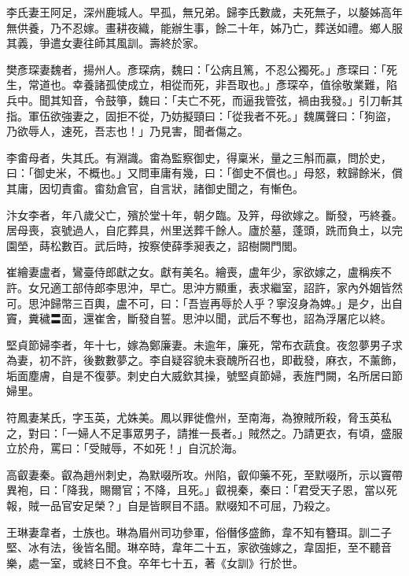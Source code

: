 \begin{pinyinscope}
 李氏妻王阿足，深州鹿城人。早孤，無兄弟。歸李氏數歲，夫死無子，以嫠姊高年無供養，乃不忍嫁。畫耕夜織，能辦生事，餘二十年，姊乃亡，葬送如禮。鄉人服其義，爭遣女妻往師其風訓。壽終於家。



 樊彥琛妻魏者，揚州人。彥琛病，魏曰：「公病且篤，不忍公獨死。」彥琛曰：「死生，常道也。幸養諸孤使成立，相從而死，非吾取也。」彥琛卒，值徐敬業難，陷兵中。聞其知音，令鼓箏，魏曰：「夫亡不死，而逼我管弦，禍由我發。」引刀斬其指。軍伍欲強妻之，固拒不從，乃妨擬頸曰：「從我者不死。」魏厲聲曰：「狗盜，乃欲辱人，速死，吾志也！」乃見害，聞者傷之。



 李畬母者，失其氏。有淵識。畬為監察御史，得稟米，量之三斛而贏，問於史，曰：「御史米，不概也。」又問車庸有幾，曰：「御史不償也。」母怒，敕歸餘米，償其庸，因切責畬。畬劾倉官，自言狀，諸御史聞之，有慚色。



 汴女李者，年八歲父亡，殯於堂十年，朝夕臨。及笄，母欲嫁之。斷發，丐終養。居母喪，哀號過人，自庀葬具，州里送葬千餘人。廬於墓，蓬頭，跣而負土，以完園塋，蒔松數百。武后時，按察使薛季昶表之，詔樹闕門閭。



 崔繪妻盧者，鸞臺侍郎獻之女。獻有美名。繪喪，盧年少，家欲嫁之，盧稱疾不許。女兄適工部侍郎李思沖，早亡。思沖方顯重，表求繼室，詔許，家內外姻皆然可。思沖歸幣三百輿，盧不可，曰：「吾豈再辱於人乎？寧沒身為婢。」是夕，出自竇，糞穢〓面，還崔舍，斷發自誓。思沖以聞，武后不奪也，詔為浮屠庀以終。



 堅貞節婦李者，年十七，嫁為鄭廉妻。未逾年，廉死，常布衣蔬食。夜忽夢男子求為妻，初不許，後數數夢之。李自疑容貌未衰醜所召也，即截發，麻衣，不薰飾，垢面塵膚，自是不復夢。刺史白大威欽其操，號堅貞節婦，表旌門闕，名所居曰節婦里。



 符鳳妻某氏，字玉英，尤姝美。鳳以罪徙儋州，至南海，為獠賊所殺，脅玉英私之，對曰：「一婦人不足事眾男子，請推一長者。」賊然之。乃請更衣，有頃，盛服立於舟，罵曰：「受賊辱，不如死！」自沉於海。



 高叡妻秦。叡為趙州刺史，為默啜所攻。州陷，叡仰藥不死，至默啜所，示以竇帶異袍，曰：「降我，賜爾官；不降，且死。」叡視秦，秦曰：「君受天子恩，當以死報，賊一品官安足榮？」自是皆瞑目不語。默啜知不可屈，乃殺之。



 王琳妻韋者，士族也。琳為眉州司功參軍，俗僭侈盛飾，韋不知有簪珥。訓二子堅、冰有法，後皆名聞。琳卒時，韋年二十五，家欲強嫁之，韋固拒，至不聽音樂，處一室，或終日不食。卒年七十五，著《女訓》行於世。




\end{pinyinscope}

